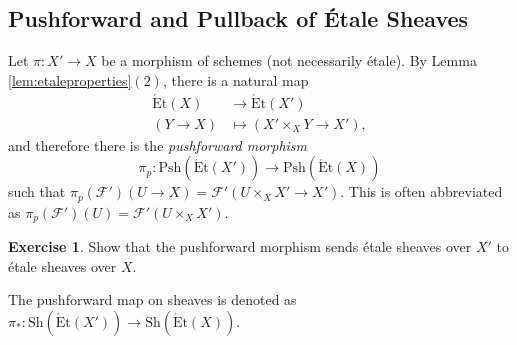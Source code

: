 \documentclass{article}
\newcommand{\Et}{\acute{\mathrm{E}}\mathrm{t}}
\newcommand{\Psh}{\mathrm{Psh}}
\newcommand{\Sh}{\mathrm{Sh}}
\theoremstyle{plain}
\theoremstyle{definition}
\newtheorem*{exercise}{Exercise}
\begin{document}
    \subsection{Pushforward and Pullback of \'{E}tale Sheaves}\label{sec:pushpull}
    Let $\pi:X'\to X$ be a morphism of schemes (not necessarily \'{e}tale). By Lemma \ref{lem:etaleproperties}$(2)$, there is a natural map 
    \begin{align*}
        \Et(X)&\longrightarrow\Et(X')\\
        (Y\to X)&\longmapsto(X'\times_X Y\to X'),
    \end{align*}
    and therefore there is the \textit{pushforward morphism}
    $$\pi_p:\Psh(\Et(X'))\longrightarrow\Psh(\Et(X))$$
    such that $\pi_p(\mathcal{F}')(U\to X)=\mathcal{F}'(U\times_X X'\to X')$. This is often abbreviated as $\pi_p(\mathcal{F}')(U)=\mathcal{F}'(U\times_X X')$.

    \begin{exercise}
        Show that the pushforward morphism sends \'{e}tale sheaves over $X'$ to \'{e}tale sheaves over $X$. 
    \end{exercise}
    The pushforward map on sheaves is denoted as $\pi_*:\Sh(\Et(X'))\rightarrow\Sh(\Et(X))$.
\end{document}
